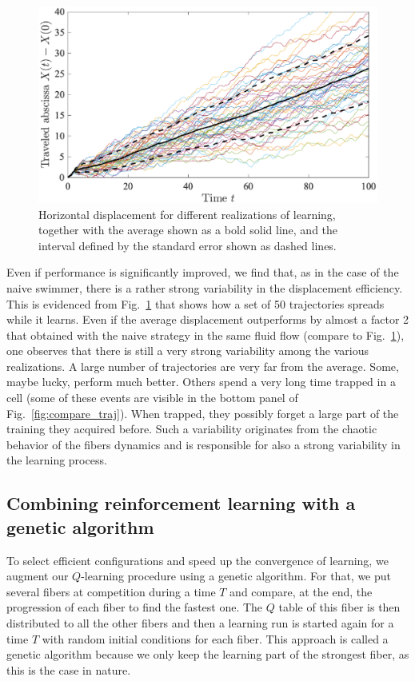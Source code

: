 \documentclass[aps,pre,reprint,superscriptaddress]{revtex4-2}
\begin{document}
\begin{figure}[ht]
  \centerline{\includegraphics[width=\columnwidth]{travel_learn_diffreal}}
  \caption{\label{fig:travel_learn_diffreal} Horizontal displacement for different realizations of  learning, together with the average shown as a bold solid line, and the interval defined by the standard error shown as dashed lines.}
\end{figure}
Even if performance is significantly improved, we find that, as in the case of the naive swimmer, there is a rather strong variability in the displacement efficiency. This is evidenced from Fig.~\ref{fig:travel_learn_diffreal} that shows how a set of 50 trajectories spreads while it learns. Even if the average displacement outperforms by almost a factor 2 that obtained with the naive strategy in the same fluid flow (compare to Fig.~\ref{fig:travel_learn_diffreal}), one observes that there is still a very strong variability among the various realizations. A large number of trajectories are very far from the average. Some, maybe lucky, perform much better. Others spend a very long time trapped in a cell (some of these events are visible in the bottom panel of Fig.~\ref{fig:compare_traj}). When trapped, they possibly forget a large part of the training they acquired before. Such a variability originates from the chaotic behavior of the fibers dynamics and is responsible for also a strong variability in the learning process.



\subsection{Combining reinforcement learning with a genetic algorithm}

To select efficient configurations and speed up the convergence of learning, we augment our $Q$-learning procedure using a genetic algorithm. For that, we put several fibers at competition during a time $T$ and compare, at the end, the progression of each fiber to find the fastest one. The $Q$ table of this fiber is then distributed to all the other fibers and then a learning run is started again for a time $T$ with random initial conditions for each fiber. This approach is called a genetic algorithm because we only keep the learning part of the strongest fiber, as this is the case in nature.
\end{document}
